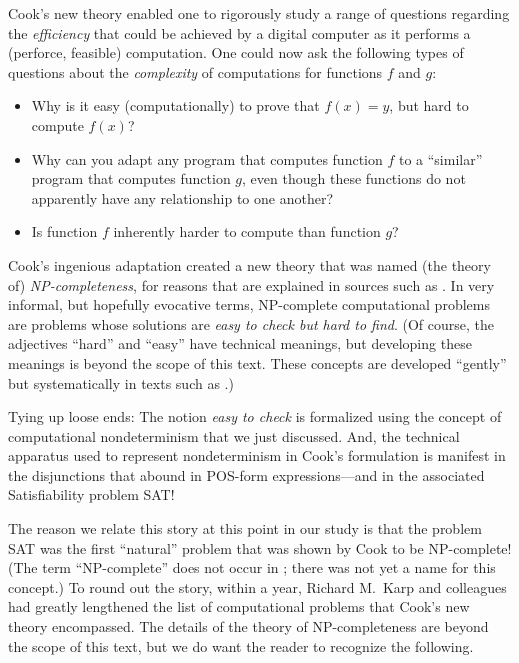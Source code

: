 {\noindent
Cook's new theory enabled one to rigorously study a range of questions regarding the {\em efficiency} that could be achieved by a digital computer as it performs a (perforce, feasible) computation.  One could now ask the following types of questions about the {\em complexity} of computations for functions $f$ and $g$:
\begin{itemize}
\item
Why is it easy (computationally) to prove that $f(x) = y$, but hard to compute $f(x)$?
\item
Why can you adapt any program that computes function $f$ to a ``similar'' program that computes function $g$, even though these functions do not apparently have any relationship to one another?
\item
Is function $f$ inherently harder to compute than function $g$?
\end{itemize}
Cook's ingenious adaptation created a new theory that was named (the theory of) {\it {\sf NP}-completeness}, for reasons that are explained in sources such as \cite{GareyJ79}.  In very informal, but hopefully evocative terms, {\sf NP}-complete computational problems are problems whose solutions are {\em easy to check but hard to find}.  (Of course, the adjectives ``hard'' and ``easy'' have technical meanings, but developing these meanings is beyond the scope of this text.  These concepts are developed ``gently'' but systematically in texts such as \cite{Rosenberg09}.)

\medskip

Tying up loose ends: The notion {\em easy to check} is formalized using the concept of computational nondeterminism that we just discussed.  And, the technical apparatus used to represent nondeterminism in Cook's formulation is manifest in the disjunctions that abound in POS-form expressions---and in the associated Satisfiability problem {\sf SAT}!


The reason we relate this story at this point in our study is that the problem {\sf SAT} was the first ``natural'' problem that was shown by Cook to be {\sf NP}-complete!  (The term ``{\sf NP}-complete'' does not occur in \cite{Cook71}; there was not yet a name for this concept.)  To round
out the story, within a year, Richard M.~Karp  and colleagues had greatly lengthened the list of computational problems that Cook's new theory encompassed.  The details of the theory of {\sf NP}-completeness are beyond the scope of this text, but we do want the reader to recognize the following.

}
